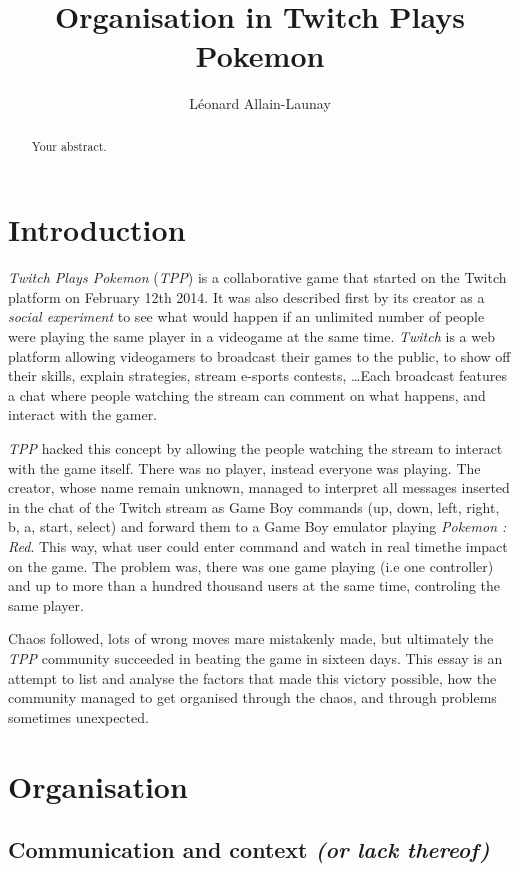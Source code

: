 \documentclass[a4paper]{article}
\title{Organisation in Twitch Plays Pokemon}
\author{Léonard Allain-Launay}
\begin{document}
\maketitle

\begin{abstract}
Your abstract.
\end{abstract}

\section{Introduction}
\textit{Twitch Plays Pokemon} (\textit{TPP}) is a collaborative game that started on the Twitch platform on February 12th 2014. It was also described first by its creator as a \textit{social experiment} to see what would happen if an unlimited number of people were playing the same player in a videogame at the same time. \textit{Twitch} is a web platform allowing videogamers to broadcast their games to the public, to show off their skills, explain strategies, stream e-sports contests, \dots  Each broadcast features a chat where people watching the stream can comment on what happens, and interact with the gamer.

\textit{TPP} hacked this concept by allowing the people watching the stream to interact with the game itself. There was no player, instead everyone was playing. The creator, whose name remain unknown, managed to interpret all messages inserted in the chat of the Twitch stream as Game Boy commands (up, down, left, right, b, a, start, select) and forward them to a Game Boy emulator playing \textit{Pokemon : Red}. This way, what user could enter command and watch in real timethe impact on the game. The problem was, there was one game playing (i.e one controller) and up to more than a hundred thousand users at the same time, controling the same player.

 Chaos followed, lots of wrong moves mare mistakenly made, but ultimately the \textit{TPP} community succeeded in beating the game in sixteen days. This essay is an attempt to list and analyse the factors that made this victory possible, how the community managed to get organised through the chaos, and through problems sometimes unexpected.
\section{Organisation}

\subsection{Communication and context \textit{(or lack thereof)}}
\end{document}
